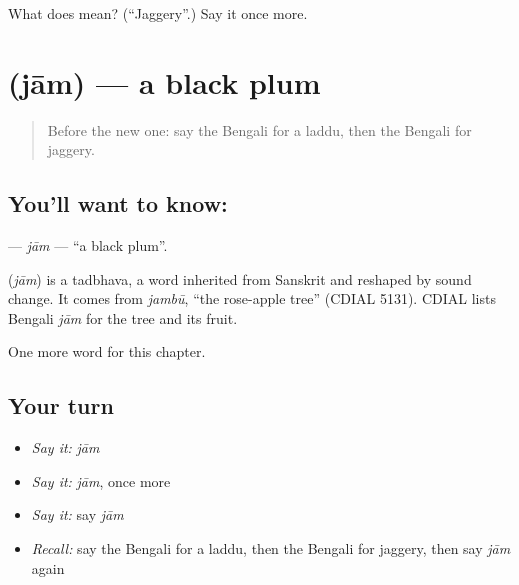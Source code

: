 \begin{tcolorbox}[breakable,colback=teal!4,colframe=teal!35!black,title={Before you move on}]
What does  mean? (\textquotedblleft{}Jaggery\textquotedblright{}.) Say it once more.
\end{tcolorbox}
\section[\texorpdfstring{\bn{জাম} (jām)}{জাম (jām)}]{ (jām) — a black plum}

\label{lesson:BN-C173-jam}



\begin{quote}
Before the new one: say the Bengali for a laddu, then the Bengali for jaggery.
\end{quote}

\subsection*{You'll want to know: }
\textbf{} — \emph{jām} — \textquotedblleft{}a black plum\textquotedblright{}.

\begin{cousinweb}
\textbf{} (\emph{jām}) is a tadbhava, a word inherited from Sanskrit and reshaped by sound change. It comes from \emph{jambū}, \textquotedblleft{}the rose-apple tree\textquotedblright{} (CDIAL 5131). CDIAL lists Bengali \emph{jām} for the tree and its fruit.
\end{cousinweb}

\begin{grammarlens}[title={What you've built}]
One more word for this chapter.
\end{grammarlens}

\subsection*{Your turn}
\begin{itemize}
\raggedright
  \item \emph{Say it:} \emph{jām}
  \item \emph{Say it:} \emph{jām}, once more
  \item \emph{Say it:} say \emph{jām}
  \item \emph{Recall:} say the Bengali for a laddu, then the Bengali for jaggery, then say \emph{jām} again
\end{itemize}

